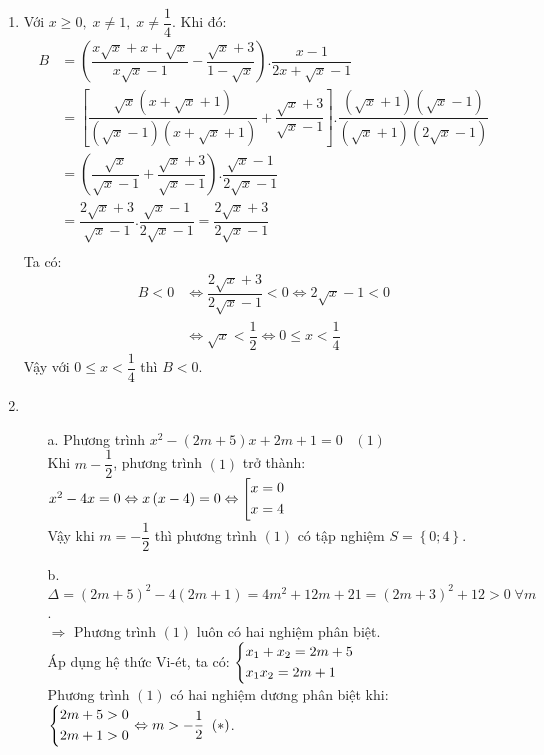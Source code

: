 \begin{ex}
{\begin{enumerate}
        
        Vậy nghiệm của hệ phương trình là $\left(3;1\right)$.
        \item Với $x\ge 0,\; x\ne 1,\; x\ne \dfrac{1}{4}$. Khi đó:
        \begin{align*}
        B&=\left(\dfrac{x\sqrt{x}+x+\sqrt{x}}{x\sqrt{x}-1}-\dfrac{\sqrt{x}+3}{1-\sqrt{x}}\right).\dfrac{x-1}{2x+\sqrt{x}-1}\\
        &=\left[\dfrac{\sqrt{x}\left(x+\sqrt{x}+1\right)}{\left(\sqrt{x}-1\right)\left(x+\sqrt{x}+1\right)}+\dfrac{\sqrt{x}+3}{\sqrt{x}-1}\right].\dfrac{\left(\sqrt{x}+1\right)\left(\sqrt{x}-1\right)}{\left(\sqrt{x}+1\right)\left(2\sqrt{x}-1\right)}\\
        &=\left(\dfrac{\sqrt{x}}{\sqrt{x}-1}+\dfrac{\sqrt{x}+3}{\sqrt{x}-1}\right).\dfrac{\sqrt{x}-1}{2\sqrt{x}-1}\\
        &=\dfrac{2\sqrt{x}+3}{\sqrt{x}-1}.\dfrac{\sqrt{x}-1}{2\sqrt{x}-1}=\dfrac{2\sqrt{x}+3}{2\sqrt{x}-1}\\ 
        \end{align*}
        Ta có:
        \begin{align*}
        B<0&\Leftrightarrow \dfrac{2\sqrt{x}+3}{2\sqrt{x}-1}<0\Leftrightarrow 2\sqrt{x}-1<0\\
        &\Leftrightarrow \sqrt{x}<\dfrac{1}{2}\Leftrightarrow 0\le x<\dfrac{1}{4}
        \end{align*}
        Vậy với $0\le x<\dfrac{1}{4}$ thì $B<0$.
        \item 
        \begin{enumerate}
         \item[a.] Phương trình $x^2-\left(2m+5\right)x+2m+1=0\;\;\;(1)$\\
         Khi $m-\dfrac{1}{2}$, phương trình $(1)$ trở thành:
         $x^2-4x=0\Leftrightarrow x\left(x-4\right)=0\Leftrightarrow\left[\begin{aligned}&x=0\\&x=4\end{aligned}\right.$\\
         Vậy khi $m=-\dfrac{1}{2}$ thì phương trình $(1)$ có tập nghiệm $S=\left\{0;4\right\}$.
         \item[b.] $\Delta = \left(2m+5\right)^2-4\left(2m+1\right)=4m^2+12m+21=\left(2m+3\right)^2+12>0\; \forall m$.\\
         $\Rightarrow $ Phương trình $(1)$ luôn có hai nghiệm phân biệt.\\
         Áp dụng hệ thức Vi-ét, ta có: $\left\{\begin{aligned}&x_1+x_2=2m+5\\&x_1x_2=2m+1\end{aligned}\right.$\\
         Phương trình $(1)$ có hai nghiệm dương phân biệt khi: $\left\{\begin{aligned}&2m+5>0\\&2m+1>0\end{aligned}\right.\Leftrightarrow m>-\dfrac{1}{2}\;\;(*)$.\\

\end{enumerate}
\end{enumerate}}
\end{ex}
